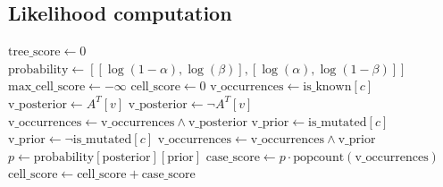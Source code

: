 \subsection{Likelihood computation}
\label{subsec:likelihood}

\begin{algorithm}[tbh]
    \begin{algorithmic}[1]
        \STATE $\mathrm{tree\_score} \leftarrow 0$
        \STATE $\mathrm{probability} \leftarrow [[\log(1-\alpha), \log(\beta)], [\log(\alpha), \log(1-\beta)]]$
        \STATE
            \STATE $\mathrm{max\_cell\_score} \leftarrow -\infty$
            \STATE
             \label{lst2:node_loop}
                \STATE $\mathrm{cell\_score} \leftarrow 0$
                \STATE
                \STATE {}
                 \label{lst2:events_loop}
                    \STATE {}
                    \STATE $\mathrm{v\_occurrences} \leftarrow \mathrm{is\_known}[c]$ 
                    \STATE
                    \STATE {}
                        \STATE $\mathrm{v\_posterior} \leftarrow A^T[v]$
                    \ELSE
                        \STATE $\mathrm{v\_posterior} \leftarrow \neg A^T[v]$
                    \ENDIF
                    \STATE $\mathrm{v\_occurrences} \leftarrow \mathrm{v\_occurrences} \wedge \mathrm{v\_posterior}$
                    \STATE
                    \STATE {}
                        \STATE $\mathrm{v\_prior} \leftarrow \mathrm{is\_mutated}[c]$
                    \ELSE
                        \STATE $\mathrm{v\_prior} \leftarrow \neg\mathrm{is\_mutated}[c]$
                    \ENDIF
                    \STATE $\mathrm{v\_occurrences} \leftarrow \mathrm{v\_occurrences} \wedge \mathrm{v\_prior}$
                    \STATE
                    \STATE {}
                    \STATE $p \leftarrow \mathrm{probability}[\mathrm{posterior}][\mathrm{prior}]$
                    \STATE $\mathrm{case\_score} \leftarrow p \cdot \mathrm{popcount}(\mathrm{v\_occurrences})$ \label{lst2:popcount}
                    \STATE $\mathrm{cell\_score} \leftarrow \mathrm{cell\_score} + \mathrm{case\_score}$

\end{algorithmic}
\end{algorithm}
